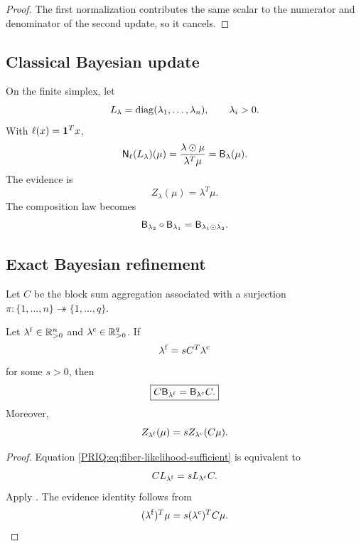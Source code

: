 \begin{proof}
The first normalization contributes the same scalar to the numerator and denominator of the second update, so it cancels.
\end{proof}

\subsection{Classical Bayesian update}
On the finite simplex, let
\[
  L_{\lambda}=\operatorname{diag}(\lambda_1,\ldots,\lambda_n),
  \qquad
  \lambda_i>0.
\]
With $\ell(x)=\mathbf 1^Tx$,
\[
  \mathsf N_{\ell}(L_{\lambda})(\mu)
  =
  \frac{\lambda\odot\mu}{\lambda^T\mu}
  =\mathsf B_{\lambda}(\mu).
\]
The evidence is
\[
  Z_{\lambda}(\mu)=\lambda^T\mu.
\]
The composition law becomes
\begin{equation}\label{PRIQ:eq:bayes-composition}
  \mathsf B_{\lambda_2}\circ\mathsf B_{\lambda_1}
  =
  \mathsf B_{\lambda_1\odot\lambda_2}.
\end{equation}

\subsection{Exact Bayesian refinement}
Let $C$ be the block sum aggregation associated with a surjection $\pi:\{1,\ldots,n\}\twoheadrightarrow\{1,\ldots,q\}$.

\begin{PRIQtheorem}\label{PRIQ:thm:bayes-sufficient}
Let $\lambda^{\mathrm f}\in\mathbb R_{>0}^n$ and $\lambda^{\mathrm c}\in\mathbb R_{>0}^q$.  If
\begin{equation}\label{PRIQ:eq:fiber-likelihood-sufficient}
  \lambda^{\mathrm f}=sC^T\lambda^{\mathrm c}
\end{equation}
for some $s>0$, then
\begin{equation}\label{PRIQ:eq:exact-bayes-refinement}
  \boxed{
  C\mathsf B_{\lambda^{\mathrm f}}
  =
  \mathsf B_{\lambda^{\mathrm c}}C.}
\end{equation}
Moreover,
\begin{equation}\label{PRIQ:eq:evidence-scaling}
  Z_{\lambda^{\mathrm f}}(\mu)
  =
  sZ_{\lambda^{\mathrm c}}(C\mu).
\end{equation}
\end{PRIQtheorem}

\begin{proof}
Equation \eqref{PRIQ:eq:fiber-likelihood-sufficient} is equivalent to
\[
  CL_{\lambda^{\mathrm f}}
  =sL_{\lambda^{\mathrm c}}C.
\]
Apply .  The evidence identity follows from
\[
  (\lambda^{\mathrm f})^T\mu
  =s(\lambda^{\mathrm c})^TC\mu.
\]
\end{proof}

